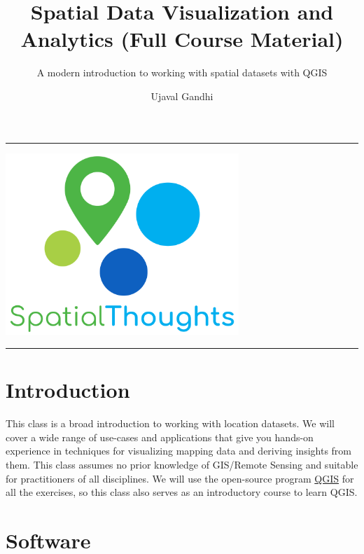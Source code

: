 \documentclass[
  12pt,
  a4paper]{article}
\title{Spatial Data Visualization and Analytics (Full Course Material)}
\subtitle{A modern introduction to working with spatial datasets with
QGIS}
\author{Ujaval Gandhi}
\date{}
\begin{document}
\maketitle

{
\setcounter{tocdepth}{3}
\tableofcontents
}
\newpage

\begin{center}\rule{0.5\linewidth}{0.5pt}\end{center}

\begin{center}\includegraphics[width=250pt]{images/spatial_thoughts_logo} \end{center}

\begin{center}\rule{0.5\linewidth}{0.5pt}\end{center}

\hypertarget{introduction}{%
\section{Introduction}\label{introduction}}

This class is a broad introduction to working with location datasets. We
will cover a wide range of use-cases and applications that give you
hands-on experience in techniques for visualizing mapping data and
deriving insights from them. This class assumes no prior knowledge of
GIS/Remote Sensing and suitable for practitioners of all disciplines. We
will use the open-source program \href{https://qgis.org/en/site/}{QGIS}
for all the exercises, so this class also serves as an introductory
course to learn QGIS.

\hypertarget{software}{%
\section{Software}\label{software}}
\end{document}
